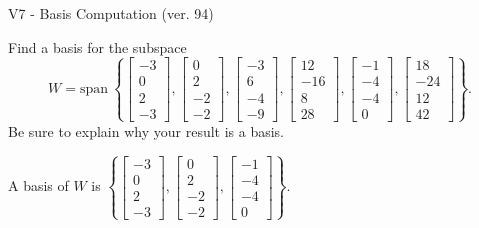\begin{exercise}
  \begin{exerciseTitle}V7 - Basis Computation (ver. 94)\end{exerciseTitle}
  \begin{exerciseStatement}
    Find a basis for the subspace 
\[W=\mathrm{span}\ \left\{\left[\begin{array}{r}
-3 \\
0 \\
2 \\
-3
\end{array}\right] , \left[\begin{array}{r}
0 \\
2 \\
-2 \\
-2
\end{array}\right] , \left[\begin{array}{r}
-3 \\
6 \\
-4 \\
-9
\end{array}\right] , \left[\begin{array}{r}
12 \\
-16 \\
8 \\
28
\end{array}\right] , \left[\begin{array}{r}
-1 \\
-4 \\
-4 \\
0
\end{array}\right] , \left[\begin{array}{r}
18 \\
-24 \\
12 \\
42
\end{array}\right]\right\}.\]
 Be sure to explain why your result is a basis.


  \end{exerciseStatement}
  \begin{exerciseAnswer}
   A basis of \(W\) is  \(\left\{\left[\begin{array}{r}
-3 \\
0 \\
2 \\
-3
\end{array}\right] , \left[\begin{array}{r}
0 \\
2 \\
-2 \\
-2
\end{array}\right] , \left[\begin{array}{r}
-1 \\
-4 \\
-4 \\
0
\end{array}\right]\right\}\).
  


  \end{exerciseAnswer}
\end{exercise}